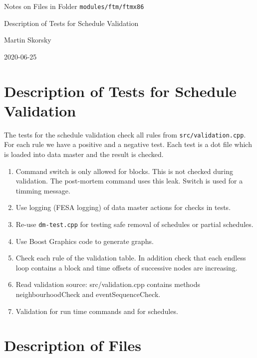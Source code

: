 \documentclass[12pt,a4paper]{report}
\begin{document}
\begin{titlepage}
\vspace{2cm}
\begin{center}
\Huge{Notes on Files in Folder \texttt{modules/ftm/ftmx86}}

\Huge{Description of Tests for Schedule Validation}

\Large{Martin Skorsky}

\Large{2020-06-25}
\end{center}
\vfill
\end{titlepage}

\tableofcontents

\chapter{Description of Tests for Schedule Validation}
The tests for the schedule validation check all rules from \texttt{src/validation.cpp}. For each rule we have a positive and a negative test. Each test is a dot file which is loaded into data master and the result is checked.

\begin{enumerate}
    \item Command switch is only allowed for blocks. This is not checked during validation. The post-mortem command uses this leak. Switch is used for a timming message.
    \item Use logging (FESA logging) of data master actions for checks in tests. 
    \item Re-use \texttt{dm-test.cpp} for testing safe removal of schedules or partial schedules.
    \item Use Boost Graphics code to generate graphs.
    \item Check each rule of the validation table. In addition check that each endless loop contains a block and time offsets of successive nodes are increasing.
    \item Read validation source: src/validation.cpp contains methods neighbourhoodCheck and eventSequenceCheck.
    \item Validation for run time commands and for schedules.
\end{enumerate}

\chapter{Description of Files}
\end{document}
